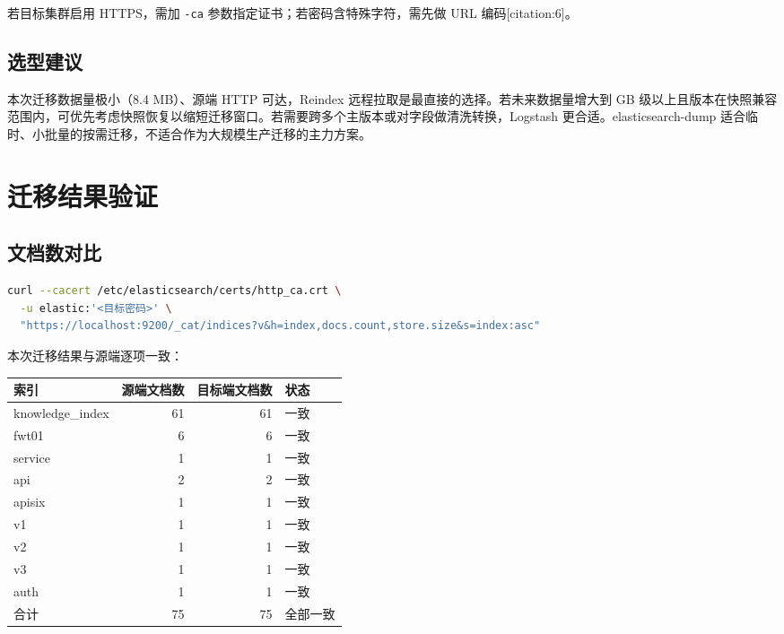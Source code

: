 \documentclass[11pt,a4paper,openany]{ctexbook}
\begin{document}
若目标集群启用 HTTPS，需加 \texttt{-ca} 参数指定证书；若密码含特殊字符，需先做 URL 编码[citation:6]。

\section{选型建议}

本次迁移数据量极小（8.4 MB）、源端 HTTP 可达，Reindex 远程拉取是最直接的选择。若未来数据量增大到 GB 级以上且版本在快照兼容范围内，可优先考虑快照恢复以缩短迁移窗口。若需要跨多个主版本或对字段做清洗转换，Logstash 更合适。elasticsearch-dump 适合临时、小批量的按需迁移，不适合作为大规模生产迁移的主力方案。

\chapter{迁移结果验证}

\section{文档数对比}

\begin{lstlisting}[language=bash]
curl --cacert /etc/elasticsearch/certs/http_ca.crt \
  -u elastic:'<目标密码>' \
  "https://localhost:9200/_cat/indices?v&h=index,docs.count,store.size&s=index:asc"
\end{lstlisting}

本次迁移结果与源端逐项一致：

\begin{center}
\begin{tabular}{@{}lrrl@{}}
\toprule
索引 & 源端文档数 & 目标端文档数 & 状态 \\
\midrule
knowledge\_index & 61 & 61 & 一致 \\
fwt01 & 6 & 6 & 一致 \\
service & 1 & 1 & 一致 \\
api & 2 & 2 & 一致 \\
apisix & 1 & 1 & 一致 \\
v1 & 1 & 1 & 一致 \\
v2 & 1 & 1 & 一致 \\
v3 & 1 & 1 & 一致 \\
auth & 1 & 1 & 一致 \\
\midrule
合计 & 75 & 75 & 全部一致 \\
\bottomrule
\end{tabular}
\end{center}
\end{document}
